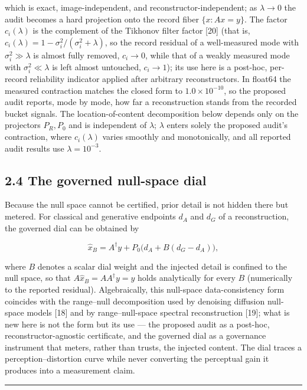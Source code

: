 \documentclass[11pt]{article}
\begin{document}
which is exact, image-independent, and reconstructor-independent; as $\lambda \to 0$ the audit becomes a hard projection onto the record fiber $\{x: Ax = y\}$. The factor $c_i(\lambda)$ is the complement of the Tikhonov filter factor [20] (that is, $c_i(\lambda) = 1 - \sigma_i^2/(\sigma_i^2+\lambda)$, so the record residual of a well-measured mode with $\sigma_i^2 \gg \lambda$ is almost fully removed, $c_i \to 0$, while that of a weakly measured mode with $\sigma_i^2 \ll \lambda$ is left almost untouched, $c_i \to 1$); its use here is a post-hoc, per-record reliability indicator applied after arbitrary reconstructors. In float64 the measured contraction matches the closed form to $1.0\times10^{-10}$, so the proposed audit reports, mode by mode, how far a reconstruction stands from the recorded bucket signals. The location-of-content decomposition below depends only on the projectors $P_R, P_0$ and is independent of $\lambda$; $\lambda$ enters solely the proposed audit's contraction, where $c_i(\lambda)$ varies smoothly and monotonically, and all reported audit results use $\lambda = 10^{-3}$.

\subsection*{2.4 The governed null-space dial}

Because the null space cannot be certified, prior detail is not hidden there but metered. For classical and generative endpoints $d_A$ and $d_G$ of a reconstruction, the governed dial can be obtained by

$$\hat{x}_B = A^{\dagger}y + P_0\big(d_A + B(d_G - d_A)\big),$$

where $B$ denotes a scalar dial weight and the injected detail is confined to the null space, so that $A\hat{x}_B = A A^{\dagger}y = y$ holds analytically for every $B$ (numerically to the reported residual). Algebraically, this null-space data-consistency form coincides with the range--null decomposition used by denoising diffusion null-space models [18] and by range--null-space spectral reconstruction [19]; what is new here is not the form but its use --- the proposed audit as a post-hoc, reconstructor-agnostic certificate, and the governed dial as a governance instrument that meters, rather than trusts, the injected content. The dial traces a perception--distortion curve while never converting the perceptual gain it produces into a measurement claim.

\medskip\hrule\medskip
\end{document}
